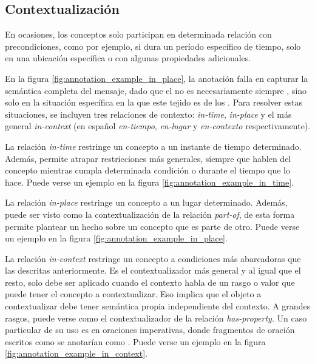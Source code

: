 \vspace{-0.2in}
\subsection{Contextualización}
En ocasiones, los conceptos solo participan en determinada relación con precondiciones, como por ejemplo, si dura un período específico de tiempo, solo en una ubicación específica o con algunas propiedades adicionales.

En la figura \ref{fig:annotation_example_in_place}, la anotación  falla en capturar la semántica completa del mensaje, dado que el  no es necesariamente siempre , sino solo en la situación específica en la que este tejido es de los . Para resolver estas situaciones, se incluyen tres relaciones de contexto: \textit{in-time}, \textit{in-place} y el más general \textit{in-context} (en español \textit{en-tiempo}, \textit{en-lugar} y \textit{en-contexto} respectivamente).

La relación \textit{in-time} restringe un concepto a un instante de tiempo determinado. Además, permite atrapar restricciones más generales, siempre que hablen del concepto mientras cumpla determinada condición o durante el tiempo que lo hace. Puede verse un ejemplo en la figura \ref{fig:annotation_example_in_time}.

La relación \textit{in-place} restringe un concepto a un lugar determinado. Además, puede ser visto como la contextualización de la relación \textit{part-of}, de esta forma permite plantear un hecho sobre un concepto que es parte de otro. Puede verse un ejemplo en la figura \ref{fig:annotation_example_in_place}.

La relación \textit{in-context} restringe un concepto a condiciones más abarcadoras que las descritas anteriormente. Es el contextualizador más general y al igual que el resto, solo debe ser aplicado cuando el contexto habla de un rasgo o valor que puede tener el concepto a contextualizar. Eso implica que el objeto a contextualizar debe tener semántica propia independiente del contexto. A grandes rasgos, puede verse como el contextualizador de la relación \textit{has-property}. Un caso particular de su uso es en oraciones imperativas, donde fragmentos de oración escritos como  se anotarían como . Puede verse un ejemplo en la figura \ref{fig:annotation_example_in_context}.

